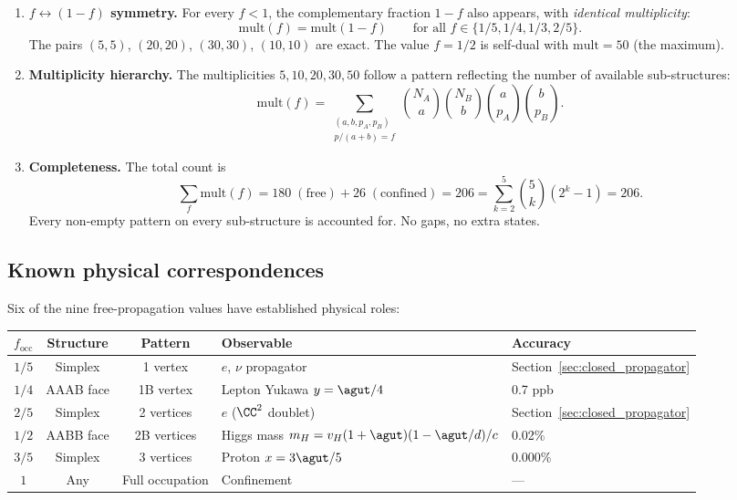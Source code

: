 \begin{enumerate}
\item \textbf{$f \leftrightarrow (1-f)$ symmetry.}  For every $f < 1$, the complementary fraction $1 - f$ also appears, with \emph{identical multiplicity}:
\begin{equation}
\mathrm{mult}(f) = \mathrm{mult}(1 - f) \qquad \text{for all } f \in \{1/5, 1/4, 1/3, 2/5\}.
\end{equation}
The pairs $(5, 5)$, $(20, 20)$, $(30, 30)$, $(10, 10)$ are exact.  The value $f = 1/2$ is self-dual with $\mathrm{mult} = 50$ (the maximum).

\item \textbf{Multiplicity hierarchy.}  The multiplicities $5, 10, 20, 30, 50$ follow a pattern reflecting the number of available sub-structures:
\begin{equation}
\mathrm{mult}(f) = \sum_{\substack{(a,b,p_A,p_B) \\ p/(a+b) = f}} \binom{N_A}{a}\binom{N_B}{b}\binom{a}{p_A}\binom{b}{p_B}.
\end{equation}

\item \textbf{Completeness.}  The total count is
\begin{equation}
\sum_f \mathrm{mult}(f) = 180\;(\text{free}) + 26\;(\text{confined}) = 206 = \sum_{k=2}^{5} \binom{5}{k}(2^k - 1) = 206.
\end{equation}
Every non-empty pattern on every sub-structure is accounted for.  No gaps, no extra states.
\end{enumerate}

\subsection{Known physical correspondences}
\label{sec:known_correspondences}

Six of the nine free-propagation values have established physical roles:

\begin{center}
\begin{tabular}{cccll}
\hline
$f_\mathrm{occ}$ & Structure & Pattern & Observable & Accuracy \\
\hline
$1/5$ & Simplex & 1 vertex & $e$, $\nu$ propagator & Section~\ref{sec:closed_propagator} \\
$1/4$ & AAAB face & 1B vertex & Lepton Yukawa $y = \agut/4$ & 0.7 ppb \\
$2/5$ & Simplex & 2 vertices & $e$ ($\CC^2$ doublet) & Section~\ref{sec:closed_propagator} \\
$1/2$ & AABB face & 2B vertices & Higgs mass $m_H = v_H(1+\agut)(1-\agut/d)/c$ & 0.02\% \\
$3/5$ & Simplex & 3 vertices & Proton $x = 3\agut/5$ & 0.000\% \\
$1$   & Any & Full occupation & Confinement & --- \\
\hline
\end{tabular}
\end{center}

